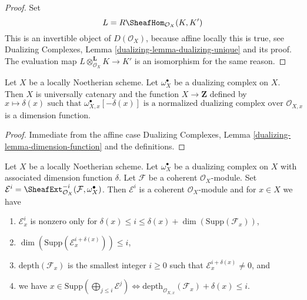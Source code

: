 \begin{proof}
Set
$$
L = R\SheafHom_{\mathcal{O}_X}(K, K')
$$
This is an invertible object of $D(\mathcal{O}_X)$, because affine locally
this is true, see Dualizing Complexes, Lemma
\ref{dualizing-lemma-dualizing-unique} and its proof.
The evaluation map $L \otimes_{\mathcal{O}_X}^\mathbf{L} K \to K'$
is an isomorphism for the same reason.
\end{proof}

\begin{lemma}
\label{lemma-dimension-function-scheme}
Let $X$ be a locally Noetherian scheme. Let $\omega_X^\bullet$
be a dualizing complex on $X$. Then $X$ is universally catenary
and the function
$X \to \mathbf{Z}$ defined by
$$
x \longmapsto \delta(x)\text{ such that }
\omega_{X, x}^\bullet[-\delta(x)]
\text{ is a normalized dualizing complex over }
\mathcal{O}_{X, x}
$$
is a dimension function.
\end{lemma}

\begin{proof}
Immediate from the affine case
Dualizing Complexes, Lemma \ref{dualizing-lemma-dimension-function}
and the definitions.
\end{proof}

\begin{lemma}
\label{lemma-sitting-in-degrees}
Let $X$ be a locally Noetherian scheme. Let $\omega_X^\bullet$
be a dualizing complex on $X$ with associated dimension function $\delta$.
Let $\mathcal{F}$ be a coherent $\mathcal{O}_X$-module. Set
$\mathcal{E}^i = \SheafExt^{-i}_{\mathcal{O}_X}(\mathcal{F}, \omega_X^\bullet)$.
Then $\mathcal{E}^i$ is a coherent $\mathcal{O}_X$-module and
for $x \in X$ we have
\begin{enumerate}
\item $\mathcal{E}^i_x$ is nonzero only for
$\delta(x) \leq i \leq \delta(x) + \dim(\text{Supp}(\mathcal{F}_x))$,
\item $\dim(\text{Supp}(\mathcal{E}^{i + \delta(x)}_x)) \leq i$,
\item $\text{depth}(\mathcal{F}_x)$ is the smallest integer
$i \geq 0$ such that $\mathcal{E}_x^{i + \delta(x)} \not = 0$, and
\item we have
$x \in \text{Supp}(\bigoplus_{j \leq i} \mathcal{E}^j)
\Leftrightarrow
\text{depth}_{\mathcal{O}_{X, x}}(\mathcal{F}_x) + \delta(x) \leq i$.
\end{enumerate}
\end{lemma}

